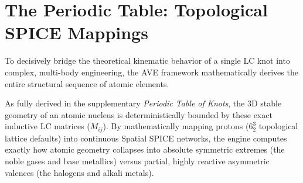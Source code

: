 \section{The Periodic Table: Topological SPICE Mappings}
To decisively bridge the theoretical kinematic behavior of a single LC knot into complex, multi-body engineering, the AVE framework mathematically derives the entire structural sequence of atomic elements. 

As fully derived in the supplementary \textit{Periodic Table of Knots}, the 3D stable geometry of an atomic nucleus is deterministically bounded by these exact inductive LC matrices ($M_{ij}$). By mathematically mapping protons ($6^3_2$ topological lattice defaults) into continuous Spatial SPICE networks, the engine computes exactly how atomic geometry collapses into absolute symmetric extremes (the noble gases and base metallics) versus partial, highly reactive asymmetric valences (the halogens and alkali metals).

